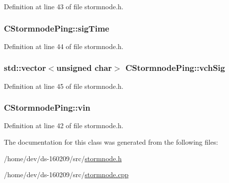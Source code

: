 Definition at line 43 of file stormnode.\+h.

\hypertarget{class_c_stormnode_ping_a9444c0ea28227eac0f3b3a0266ce0e9e}{}
\subsubsection[{sig\+Time}]{ C\+Stormnode\+Ping\+::sig\+Time}\label{class_c_stormnode_ping_a9444c0ea28227eac0f3b3a0266ce0e9e}


Definition at line 44 of file stormnode.\+h.

\hypertarget{class_c_stormnode_ping_af0e27eadd1e12a8c75540c012d835ce1}{}
\subsubsection[{vch\+Sig}]{\setlength{\rightskip}{0pt plus 5cm}std\+::vector$<$unsigned char$>$ C\+Stormnode\+Ping\+::vch\+Sig}\label{class_c_stormnode_ping_af0e27eadd1e12a8c75540c012d835ce1}


Definition at line 45 of file stormnode.\+h.

\hypertarget{class_c_stormnode_ping_a83adfd5f2331b88deb60e44df9c878d9}{}
\subsubsection[{vin}]{ C\+Stormnode\+Ping\+::vin}\label{class_c_stormnode_ping_a83adfd5f2331b88deb60e44df9c878d9}


Definition at line 42 of file stormnode.\+h.



The documentation for this class was generated from the following files\+:\begin{DoxyCompactItemize}
\item 
/home/dev/ds-\/160209/src/\hyperlink{stormnode_8h}{stormnode.\+h}\item 
/home/dev/ds-\/160209/src/\hyperlink{stormnode_8cpp}{stormnode.\+cpp}\end{DoxyCompactItemize}
